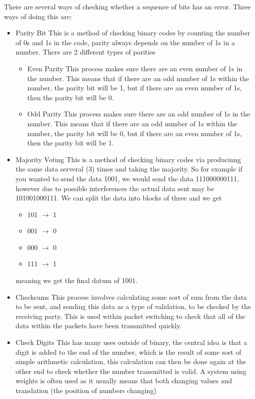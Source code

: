   There are several ways of checking whether a sequence of bits has an error. Three ways of doing this are:
  \begin{itemize}
    \setlength{\itemsep}{0em}
    \item Parity Bit
      \subitem This is a method of checking binary codes by counting the number of 0s and 1s in the code, parity always depends on the number of 1s in a number. There are 2 different types of parities
      \begin{itemize}
        \setlength{\itemsep}{0em}
        \item Even Parity
          \subitem This process makes sure there are an even number of 1s in the number. This means that if there are an odd number of 1s within the number, the parity bit will be 1, but if there are an even number of 1s, then the parity bit will be 0.
        \item Odd Parity
          \subitem This process makes sure there are an odd number of 1s in the number. This means that if there are an odd number of 1s within the number, the parity bit will be 0, but if there are an even number of 1s, then the parity bit will be 1.
      \end{itemize}
    \item Majority Voting
      \subitem This is a method of checking binary codes via producinng the same data serveral (3) times and taking the majority. So for example if you wanted to send the data 1001, we would send the data 111000000111, however due to possible interferences the actual data sent may be 101001000111. We can split the data into blocks of three and we get
      \begin{itemize}
        \setlength{\itemsep}{0em}
        \item 101 $\to$ 1
        \item 001 $\to$ 0
        \item 000 $\to$ 0
        \item 111 $\to$ 1
      \end{itemize}
      \subitem meaning we get the final datum of 1001.
    \item Checksums
	  \subitem This process involves calculating some sort of sum from the data to be sent, and sending this data as a type of validation, to be checked by the receiving party. This is used within packet switching to check that all of the data within the packets have been transmitted quickly.
    \item Check Digits
      \subitem This has many uses outside of binary, the central idea is that a digit is added to the end of the number, which is the result of some sort of simple arithmetic calculation, this calculation can then be done again at the other end to check whether the number transmitted is valid. A system using weights is often used as it usually means that both changing values and translation (the position of numbers changing)
  \end{itemize}

